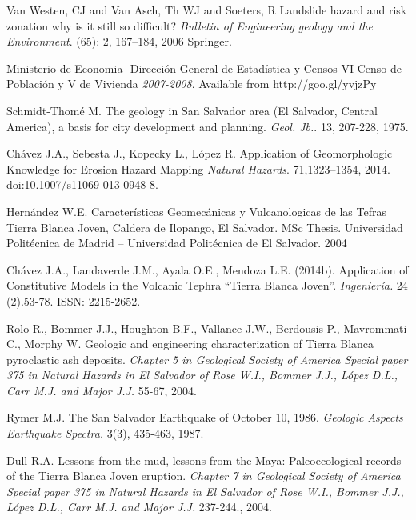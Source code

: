 \documentclass[11pt,twoside]{rmta2010eng}%
\begin{document}
\begin{thebibliography}{99}
Van Westen, CJ and Van Asch, Th WJ and Soeters, R
\newblock Landslide hazard and risk zonation why is it still so difficult?
\newblock \emph{Bulletin of Engineering geology and the Environment}.
(65): 2, 167--184, 2006
\newblock Springer. 



Ministerio de Economia- Direcci\'{o}n General de Estad\'{i}stica y Censos
\newblock VI Censo de Poblaci\'{o}n y V de Vivienda
\newblock \emph{2007-2008}.
 Available from http://goo.gl/yvjzPy




Schmidt-Thom\'{e} M.
\newblock The geology in San Salvador area (El Salvador, Central America), a basis for city development and planning.
\newblock \emph{Geol. Jb.}.
 13, 207-228, 1975.


Ch\'{a}vez J.A., Sebesta J., Kopecky L., L\'{o}pez R.
\newblock Application of Geomorphologic Knowledge for Erosion Hazard Mapping
\newblock \emph{Natural Hazards}.
 71,1323–1354, 2014.
\newblock doi:10.1007/s11069-013-0948-8.


Hern\'{a}ndez W.E.
\newblock Caracter\'{i}sticas Geomec\'{a}nicas y Vulcanologicas de las Tefras Tierra Blanca Joven, Caldera de Ilopango, El Salvador.
\newblock MSc Thesis. Universidad Polit\'{e}cnica de Madrid – Universidad Polit\'{e}cnica de El Salvador.
 2004


Ch\'{a}vez J.A.,  Landaverde J.M., Ayala O.E., Mendoza L.E. (2014b). 
\newblock Application of Constitutive Models in the Volcanic Tephra ``Tierra Blanca Joven''.
\newblock \emph{Ingenier\'{i}a.}
  24 (2).53-78.
\newblock  ISSN: 2215-2652.


Rolo R., Bommer J.J., Houghton B.F., Vallance J.W., Berdousis P., Mavrommati C., Morphy W.
\newblock Geologic and engineering characterization of Tierra Blanca pyroclastic ash deposits.
\newblock \emph{Chapter 5 in Geological Society of America Special paper 375 in Natural Hazards in El Salvador of Rose W.I., Bommer J.J., L\'{o}pez D.L., Carr M.J. and Major J.J.}
  55-67, 2004.


Rymer M.J. 
\newblock The San Salvador Earthquake of October 10, 1986.
\newblock \emph{Geologic Aspects Earthquake Spectra.}
 3(3), 435-463, 1987.


Dull R.A.
\newblock Lessons from the mud, lessons from the Maya: Paleoecological records of the Tierra Blanca Joven eruption.
\newblock \emph{Chapter 7 in Geological Society of America Special paper 375 in Natural Hazards in El Salvador of Rose W.I., Bommer J.J., L\'{o}pez D.L., Carr M.J. and Major J.J.}
 237-244., 2004.


\end{thebibliography}
\end{document}
